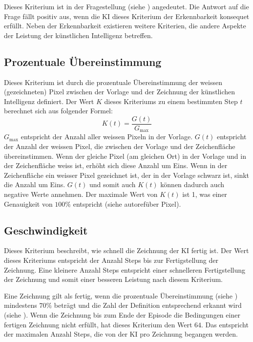 Dieses Kriterium ist in der Fragestellung (siehe )
angedeutet. Die Antwort auf die Frage fällt positiv aus, wenn die KI dieses
Kriterium der Erkennbarkeit konsequet erfüllt. Neben der Erkennbarkeit
existieren weitere Kriterien, die andere Aspekte der Leistung der künstlichen
Intelligenz betreffen.

\subsection{Prozentuale Übereinstimmung}
\label{sub:m_eval_proc}
Dieses Kriterium ist durch die prozentuale Übereinstimmung der weissen
(gezeichneten) Pixel zwischen der Vorlage und der Zeichnung der künstlichen
Intelligenz definiert. Der Wert $K$ dieses Kriteriums zu einem bestimmten Step
$t$ berechnet sich aus folgender Formel:
\[ K(t) = \frac{G(t)}{G_{\max}} \]
$G_{\max}$ entspricht der Anzahl aller weissen Pixeln in der Vorlage. $G(t)$
entspricht der Anzahl der weissen Pixel, die zwischen der Vorlage und der
Zeichenfläche übereinstimmen. Wenn der gleiche Pixel (am gleichen Ort) in der
Vorlage und in der Zeichenfläche weiss ist, erhöht sich diese Anzahl um Eins.
Wenn in der Zeichenfläche ein weisser Pixel gezeichnet ist, der in der Vorlage
schwarz ist, sinkt die Anzahl um Eins. $G(t)$ und somit auch $K(t)$ können
dadurch auch negative Werte annehmen. Der maximale Wert von $K(t)$ ist 1, was
einer Genauigkeit von $100\%$ entspricht (siehe autoref{über Pixel}).


\subsection{Geschwindigkeit}\label{sub:m_eval_speed}
Dieses Kriterium beschreibt, wie schnell die Zeichnung der KI fertig ist. Der
Wert dieses Kriteriums entspricht der Anzahl Steps bis zur Fertigstellung der
Zeichnung. Eine kleinere Anzahl Steps entspricht einer schnelleren Fertigstellung
der Zeichnung und somit einer besseren Leistung nach diesem Kriterium.

Eine Zeichnung gilt als fertig, wenn die prozentuale Übereinstimmung (siehe
) mindestens $70\%$ beträgt und die Zahl der Definition
entsprechend erkannt wird (siehe ). Wenn die Zeichnung
bis zum Ende der Episode die Bedingungen einer fertigen Zeichnung nicht erfüllt,
hat dieses Kriterium den Wert $64$. Das entspricht der maximalen Anzahl Steps,
die von der KI pro Zeichnung begangen werden.


